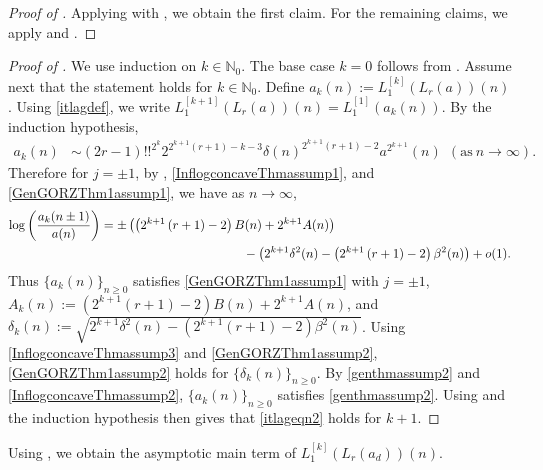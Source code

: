 \documentclass[11pt,reqno,a4paper]{amsart}
\renewcommand{\b}{\beta}
\renewcommand{\d}{{\delta}}
\renewcommand{\(}{\left\(}
\renewcommand{\)}{\right\)}
\numberwithin{equation}{section}
\theoremstyle{plain}
\theoremstyle{definition} %
\numberwithin{equation}{section}
\begin{document}
\begin{proof}[Proof of ]
Applying  with , we obtain the first claim. For the remaining claims, we apply  and .\qedhere 
\end{proof}







 


\begin{proof}[Proof of ]
We use induction on $k\in \mathbb{N}_0$.  The base case $k=0$ follows from . Assume next that the statement holds for $k\in \mathbb{N}_0$. Define $a_{k}(n):=L^{[k]}_1\left(L_r(a)\right)(n)$. Using \eqref{itlagdef}, we write $L^{[k+1]}_1(L_r(a))(n)=L^{[1]}_1(a_k(n))$.
By the induction hypothesis, 
\begin{align}\label{itlageqn2}
a_k(n)&\sim 
(2r-1)!!^{2^k}2^{ 2^{k+1}\left(r+1\right)-k-3}\d(n)^{2^{k+1}\left(r+1\right)-2} a^{2^{k+1}}(n)\ \ (\text{as}\ n\to \infty).
\end{align}
 Therefore for $j=\pm 1$, by , \ref{InflogconcaveThmassump1}, and \ref{GenGORZThm1assump1}, we have as $n\to \infty$,
\begin{align*}
\log\left(\frac{a_k(n\pm 1)}{a(n)}\right)&=\pm\left(\left(2^{k+1}\left(r+1\right)-2\right)B(n)+2^{k+1}A(n)\right)\\
&\hspace{4 cm}-\left(2^{k+1}\d^2(n)-\left(2^{k+1}\left(r+1\right)-2\right)\b^2(n)\right)+o(1).
\end{align*}
Thus  $\{a_k(n)\}_{n\ge 0}$ satisfies \ref{GenGORZThm1assump1} with $j=\pm 1$,  $A_k(n):=(2^{k+1}\left(r+1\right)-2)B(n)+ 2^{k+1} A(n)$, and $\d_k(n):=\sqrt{2^{k+1}\d^2(n)-(2^{k+1}(r+1)-2)\b^2(n)}$. Using \ref{InflogconcaveThmassump3} and \ref{GenGORZThm1assump2}, \ref{GenGORZThm1assump2} holds for $\{\d_k(n)\}_{n\ge 0}$. By \ref{genthmassump2} and \ref{InflogconcaveThmassump2}, $\{a_k(n)\}_{n\ge 0}$ satisfies \ref{genthmassump2}. Using  and the induction hypothesis then gives that \eqref{itlageqn2} holds for $k+1$.\qedhere 
\end{proof}



Using , we obtain the asymptotic main term of $L^{[k]}_1(L_r(a_d))(n)$.
\end{document}

